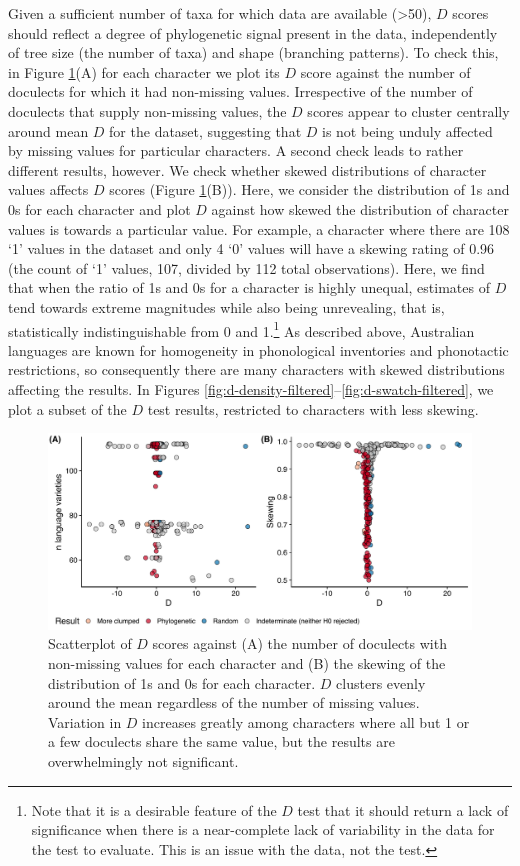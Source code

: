 Given a sufficient number of taxa for which data are available (\textgreater{}50), \(D\) scores should reflect a degree of phylogenetic signal present in the data, independently of tree size (the number of taxa) and shape (branching patterns). To check this, in Figure \ref{fig:d-scatterplots}(A) for each character we plot its \(D\) score against the number of doculects for which it had non-missing values. Irrespective of the number of doculects that supply non-missing values, the \(D\) scores appear to cluster centrally around mean \(D\) for the dataset, suggesting that \(D\) is not being unduly affected by missing values for particular characters. A second check leads to rather different results, however. We check whether skewed distributions of character values affects \(D\) scores (Figure \ref{fig:d-scatterplots}(B)). Here, we consider the distribution of 1s and 0s for each character and plot \(D\) against how skewed the distribution of character values is towards a particular value. For example, a character where there are 108 `1' values in the dataset and only 4 `0' values will have a skewing rating of 0.96 (the count of `1' values, 107, divided by 112 total observations). Here, we find that when the ratio of 1s and 0s for a character is highly unequal, estimates of \(D\) tend towards extreme magnitudes while also being unrevealing, that is, statistically indistinguishable from 0 and 1.\footnote{Note that it is a desirable feature of the \(D\) test that it should return a lack of significance when there is a near-complete lack of variability in the data for the test to evaluate. This is an issue with the data, not the test.} As described above, Australian languages are known for homogeneity in phonological inventories and phonotactic restrictions, so consequently there are many characters with skewed distributions affecting the results. In Figures \ref{fig:d-density-filtered}--\ref{fig:d-swatch-filtered}, we plot a subset of the \(D\) test results, restricted to characters with less skewing.

\begin{figure}[tbp]
\includegraphics[width=1\linewidth]{05-phylo-signal/fig/d-scatterplots} \caption[Scatterplots of $D$ scores]{Scatterplot of $D$ scores against (A) the number of doculects with non-missing values for each character and (B) the skewing of the distribution of 1s and 0s for each character. $D$ clusters evenly around the mean regardless of the number of missing values. Variation in $D$ increases greatly among characters where all but 1 or a few doculects share the same value, but the results are overwhelmingly not significant.}\label{fig:d-scatterplots}
\end{figure}

